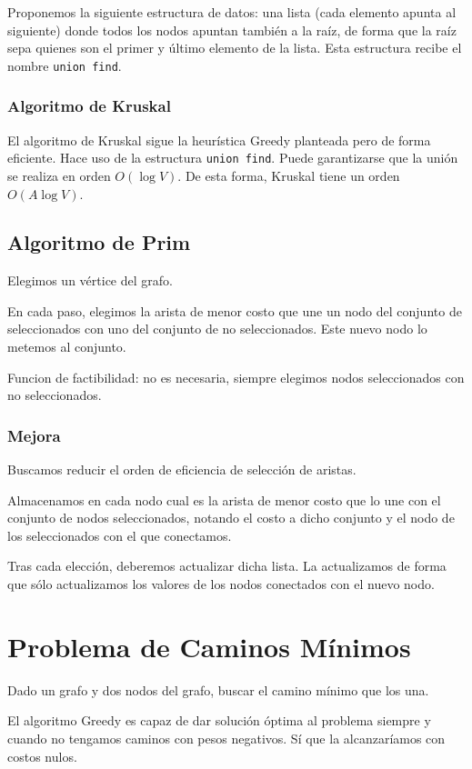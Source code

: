 Proponemos la siguiente estructura de datos: una lista (cada elemento apunta al siguiente) donde todos los nodos apuntan también a la raíz, de forma que la raíz sepa quienes son el primer y último elemento de la lista. Esta estructura recibe el nombre \verb|union find|.

\subsubsection{Algoritmo de Kruskal}
El algoritmo de Kruskal sigue la heurística Greedy planteada pero de forma eficiente. Hace uso de la estructura \verb|union find|. Puede garantizarse que la unión se realiza en orden $O(\log V)$. De esta forma, Kruskal tiene un orden $O(A\log V)$.

\subsection{Algoritmo de Prim}
Elegimos un vértice del grafo. 

En cada paso, elegimos la arista de menor costo que une un nodo del conjunto de seleccionados con uno del conjunto de no seleccionados. Este nuevo nodo lo metemos al conjunto.

Funcion de factibilidad: no es necesaria, siempre elegimos nodos seleccionados con no seleccionados.

\subsubsection{Mejora}
Buscamos reducir el orden de eficiencia de selección de aristas.

Almacenamos en cada nodo cual es la arista de menor costo que lo une con el conjunto de nodos seleccionados, notando el costo a dicho conjunto y el nodo de los seleccionados con el que conectamos.

Tras cada elección, deberemos actualizar dicha lista.
La actualizamos de forma que sólo actualizamos los valores de los nodos conectados con el nuevo nodo.

\section{Problema de Caminos Mínimos}
Dado un grafo y dos nodos del grafo, buscar el camino mínimo que los una.

El algoritmo Greedy es capaz de dar solución óptima al problema siempre y cuando no tengamos caminos con pesos negativos. Sí que la alcanzaríamos con costos nulos.

